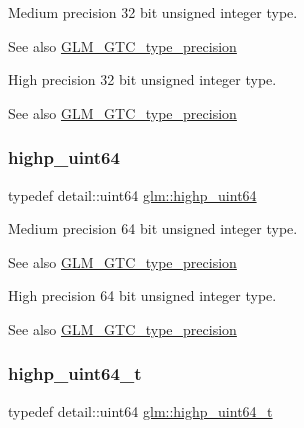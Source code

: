 Medium precision 32 bit unsigned integer type. \begin{DoxySeeAlso}{See also}
\hyperlink{group__gtc__type__precision}{G\+L\+M\+\_\+\+G\+T\+C\+\_\+type\+\_\+precision}
\end{DoxySeeAlso}
High precision 32 bit unsigned integer type. \begin{DoxySeeAlso}{See also}
\hyperlink{group__gtc__type__precision}{G\+L\+M\+\_\+\+G\+T\+C\+\_\+type\+\_\+precision} 
\end{DoxySeeAlso}
\mbox{\label{group__gtc__type__precision_ga8079c653e20cda03d34b99de629a7b09}} 
\subsubsection{\texorpdfstring{highp\+\_\+uint64}{highp\_uint64}}
{\footnotesize\ttfamily typedef detail\+::uint64 \hyperlink{group__gtc__type__precision_ga8079c653e20cda03d34b99de629a7b09}{glm\+::highp\+\_\+uint64}}

Medium precision 64 bit unsigned integer type. \begin{DoxySeeAlso}{See also}
\hyperlink{group__gtc__type__precision}{G\+L\+M\+\_\+\+G\+T\+C\+\_\+type\+\_\+precision}
\end{DoxySeeAlso}
High precision 64 bit unsigned integer type. \begin{DoxySeeAlso}{See also}
\hyperlink{group__gtc__type__precision}{G\+L\+M\+\_\+\+G\+T\+C\+\_\+type\+\_\+precision} 
\end{DoxySeeAlso}
\mbox{\label{group__gtc__type__precision_ga6e66f40c5909bfc872b068187fa6029e}} 
\subsubsection{\texorpdfstring{highp\+\_\+uint64\+\_\+t}{highp\_uint64\_t}}
{\footnotesize\ttfamily typedef detail\+::uint64 \hyperlink{group__gtc__type__precision_ga6e66f40c5909bfc872b068187fa6029e}{glm\+::highp\+\_\+uint64\+\_\+t}}

